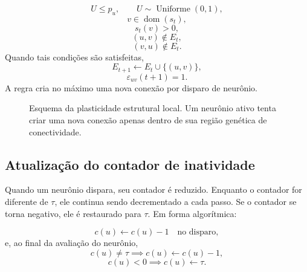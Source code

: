 \documentclass[12pt,a4paper,fleqn]{article}
\begin{document}
$$
	U\leq p_u,\qquad U\sim \operatorname{Uniforme}(0,1),
$$
$$
	v\in\operatorname{dom}(s_t),
$$
$$
	s_t(v)>0,
$$
$$
	(u,v)\notin E_t,
$$
$$
	(v,u)\notin E_t.
$$
Quando tais condições são satisfeitas,
$$
	E_{t+1}\leftarrow E_t\cup\{(u,v)\},
$$
$$
	\varepsilon_{uv}(t+1)=1.
$$
A regra cria no máximo uma nova conexão por disparo de neurônio.

\begin{figure}[H]
\centering
{}
\caption{Esquema da plasticidade estrutural local. Um neurônio ativo tenta criar uma nova conexão apenas dentro de sua região genética de conectividade.}
\label{fig:plasticidade-local}
\end{figure}

\subsection{Atualização do contador de inatividade}

Quando um neurônio dispara, seu contador é reduzido. Enquanto o contador for diferente de $\tau$, ele continua sendo decrementado a cada passo. Se o contador se torna negativo, ele é restaurado para $\tau$. Em forma algorítmica:

$$
	c(u)\leftarrow c(u)-1 \quad\text{no disparo},
$$
e, ao final da avaliação do neurônio,
$$
	c(u)\neq\tau \implies c(u)\leftarrow c(u)-1,
$$
$$
	c(u)<0 \implies c(u)\leftarrow\tau.
$$
\end{document}
